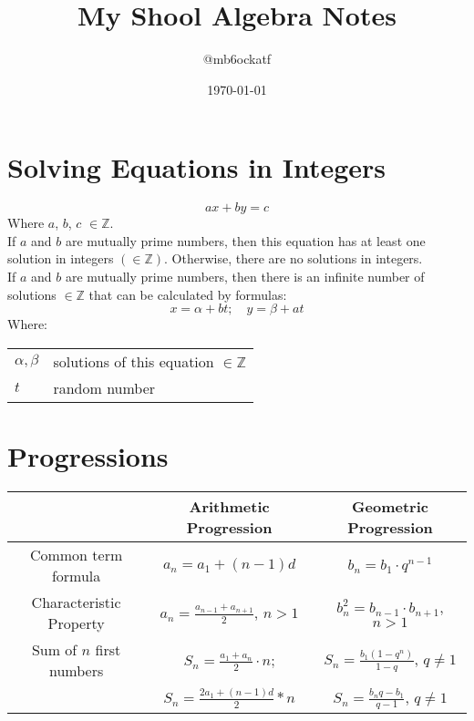 \documentclass{article}
\title{My Shool Algebra Notes}
\author{@mb6ockatf}
\date{\today}
\makeatletter
\newenvironment{conditions}
	{\par\vspace{\abovedisplayskip}\noindent\begin{tabular}{>{$}l<{$} @{${}={}$} l}}
	{\end{tabular}\par\vspace{\belowdisplayskip}}
\makeatother
\begin{document}
\maketitle
\tableofcontents

\section{Solving Equations in Integers}
\begin{equation}
	ax + by = c
\end{equation}
Where $a$, $b$, $c$ $\in\mathbb{Z}$.\\
If $a$ and $b$ are mutually prime numbers, then this equation has at least one
solution in integers $(\in\mathbb{Z})$. Otherwise, there are no solutions in
integers.\\
If $a$ and $b$ are mutually prime numbers, then there is an infinite
number of solutions $\in\mathbb{Z}$ that can be calculated by formulas:
\begin{equation}
	x = \alpha + bt; \quad y = \beta + at
\end{equation}
Where:
\begin{conditions}
	\alpha, \beta & solutions of this equation $\in\mathbb{Z}$\\
	t & random number\\
\end{conditions}


\section{Progressions}
\begin{center}
\begin{tabular}{|c|c|c|}
\hline
&Arithmetic Progression & Geometric Progression\\ \hline
Common term formula & $a_n = a_1 + (n - 1)d$ & $b_n = b_1 \cdot q^{n - 1}$\\ \hline
Characteristic Property & $a_n = \frac{a_{n-1}+a_{n+1}}{2}$, $n > 1$ &
	$b_n^2 = b_{n-1} \cdot b_{n+1}$, $n > 1$ \\ \hline
Sum of $n$ first numbers & $S_n = \frac{a_1 + a_n}{2} \cdot n$; &
	$S_n = \frac{b_1(1-q^n)}{1 - q}$, $q \neq 1$\\

& $S_n = \frac{2a_1 + (n - 1)d}{2} * n$ &
	$S_n = \frac{b_n q - b_1}{q - 1}$, $q \neq 1$ \\ \hline
\end{tabular}
\end{center}
\end{document}
